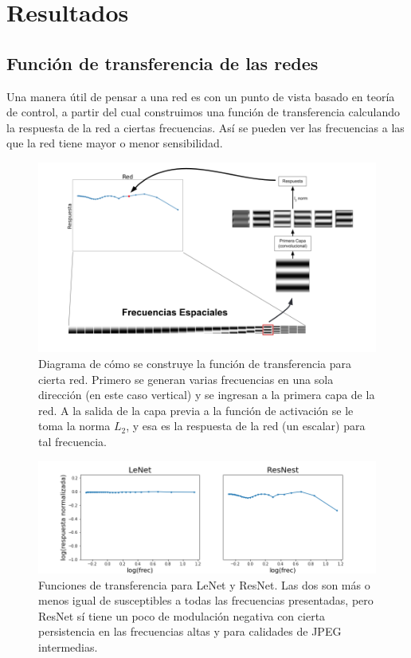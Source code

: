 \section{Resultados}

\subsection{Función de transferencia de las redes}

Una manera útil de pensar a una red es con un punto de vista basado en teoría de control, a partir del cual construimos una función de transferencia calculando la respuesta de la red a ciertas frecuencias. Así se pueden ver las frecuencias a las que la red tiene mayor o menor sensibilidad.

\begin{figure}[h!]
    \centering
    \includegraphics[width=\textwidth, trim={0 2cm 0 0},clip]{images/bode_diagrams/explanation_bode.png}
    \caption{Diagrama de cómo se construye la función de transferencia para cierta red. Primero se generan varias frecuencias en una sola dirección (en este caso vertical) y se ingresan a la primera capa de la red. A la salida de la capa previa a la función de activación se le toma la norma $L_2$, y esa es la respuesta de la red (un escalar) para tal frecuencia.}
    \label{bode_explain}
\end{figure}

\begin{figure}[h!]
    \centering
    \includegraphics[width=\textwidth]{images/bode_diagrams/mnist_nets.png}
    \caption{Funciones de transferencia para LeNet y ResNet. Las dos son más o menos igual de susceptibles a todas las frecuencias presentadas, pero ResNet sí tiene un poco de modulación negativa con cierta persistencia en las frecuencias altas y para calidades de JPEG intermedias.}
    \label{bode_examples}
\end{figure}



